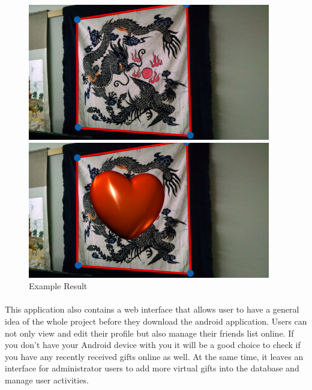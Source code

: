 \begin{figure}[H]
\centering
\begin{minipage}[t]{0.5\textwidth}
\includegraphics[width=.95\textwidth]{section01/assets/giftbox_1.png}
\subcaption{}
\end{minipage}%
\begin{minipage}[t]{0.5\textwidth}
\includegraphics[width=.95\textwidth]{section01/assets/giftbox_2.png}
\subcaption{}
\end{minipage}%

\caption[Short Caption]{Example Result}
\end{figure}

\paragraph{} This application also contains a web interface that allows user to have a general idea of the whole project before they download the android application. Users can not only view and edit their profile but also manage their friends list online. If you don't have your Android device with you it will be a good choice to check if you have any recently received gifts online as well. At the same time, it leaves an interface for administrator users to add more virtual gifts into the database and manage user activities.



